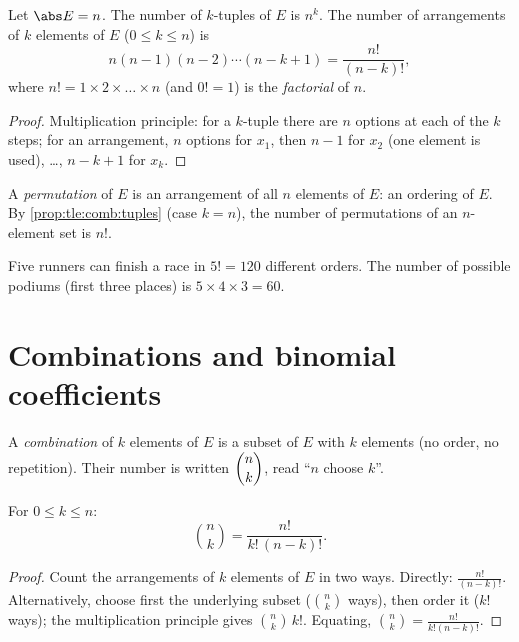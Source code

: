 \begin{proposition}\label{prop:tle:comb:tuples}
Let $\abs E = n$. The number of $k$-tuples of $E$ is $n^k$. The number of
arrangements of $k$ elements of $E$ ($0 \leq k \leq n$) is
\[
n(n-1)(n-2)\cdots(n-k+1) = \frac{n!}{(n-k)!},
\]
where $n! = 1 \times 2 \times \dots \times n$ (and $0! = 1$) is the
\emph{factorial} of $n$.
\end{proposition}

\begin{proof}
Multiplication principle: for a $k$-tuple there are $n$ options at each of
the $k$ steps; for an arrangement, $n$ options for $x_1$, then $n - 1$ for
$x_2$ (one element is used), \dots, $n - k + 1$ for $x_k$.
\end{proof}

\begin{definition}[Permutation]\label{def:tle:comb:permutation}
A \emph{permutation} of $E$ is an arrangement of all $n$
elements of $E$: an ordering of $E$. By
\cref{prop:tle:comb:tuples} (case $k = n$), the number of permutations of an
$n$-element set is $n!$.
\end{definition}

\begin{example}
Five runners can finish a race in $5! = 120$ different orders. The number of
possible podiums (first three places) is $5 \times 4 \times 3 = 60$.
\end{example}

\section{Combinations and binomial coefficients}

\begin{definition}[Combinations]\label{def:tle:comb:combination}
A \emph{combination} of $k$ elements of $E$ is a subset
of $E$ with $k$ elements (no order, no repetition). Their number is written
$\dbinom{n}{k}$, read ``$n$ choose $k$''.
\end{definition}

\begin{theorem}\label{thm:tle:comb:binomformula}
For $0 \leq k \leq n$:
\[
\binom{n}{k} = \frac{n!}{k!\,(n-k)!} .
\]
\end{theorem}

\begin{proof}
Count the arrangements of $k$ elements of $E$ in two ways. Directly:
$\frac{n!}{(n-k)!}$. Alternatively, choose first the underlying subset
($\binom nk$ ways), then order it ($k!$ ways); the multiplication principle
gives $\binom{n}{k}\,k!$. Equating,
$\binom nk = \frac{n!}{k!(n-k)!}$.
\end{proof}

